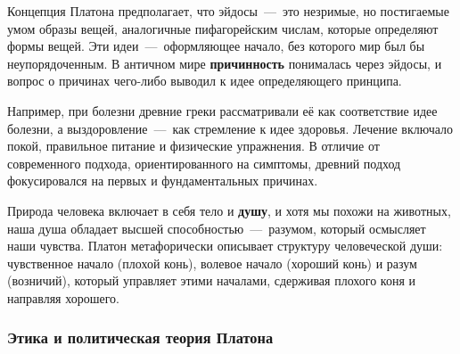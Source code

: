 Концепция Платона предполагает, что эйдосы~---~это незримые, но постигаемые умом образы вещей, аналогичные пифагорейским числам, которые определяют формы вещей. Эти идеи~---~оформляющее начало, без которого мир был бы неупорядоченным. В античном мире \textbf{причинность} понималась через эйдосы, и вопрос о причинах чего-либо выводил к идее определяющего принципа. 

Например, при болезни древние греки рассматривали её как соответствие идее болезни, а выздоровление~---~как стремление к идее здоровья. Лечение включало покой, правильное питание и физические упражнения. В отличие от современного подхода, ориентированного на симптомы, древний подход фокусировался на первых и фундаментальных причинах.


Природа человека включает в себя тело и \textbf{душу}, и хотя мы похожи на животных, наша душа обладает высшей способностью~---~разумом, который осмысляет наши чувства. Платон метафорически описывает структуру
человеческой души: чувственное начало (плохой конь), волевое начало (хороший конь) и разум (возничий), который управляет этими началами, сдерживая плохого коня и направляя хорошего.

\subsubsection{Этика и политическая теория Платона}

